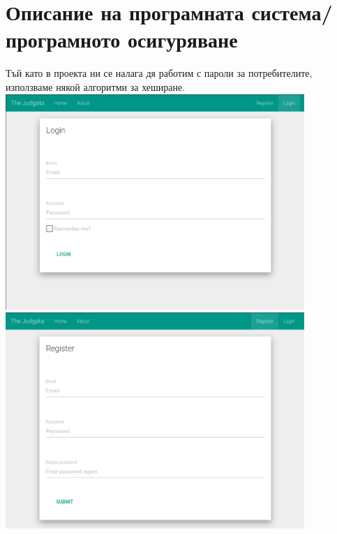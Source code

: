 \documentclass[28pt]{article}
\begin{document}
\section{Описание на програмната система/програмното осигуряване} 
Тъй като в проекта ни се налага дя работим с пароли за потребителите, използваме някой алгоритми за хеширане. \\ \vspace {0.5cm}
\includegraphics[width=0.85\textwidth]{login} \\ \vspace {0.5cm}
\includegraphics[width=0.85\textwidth]{register}
\newpage
\end{document}

